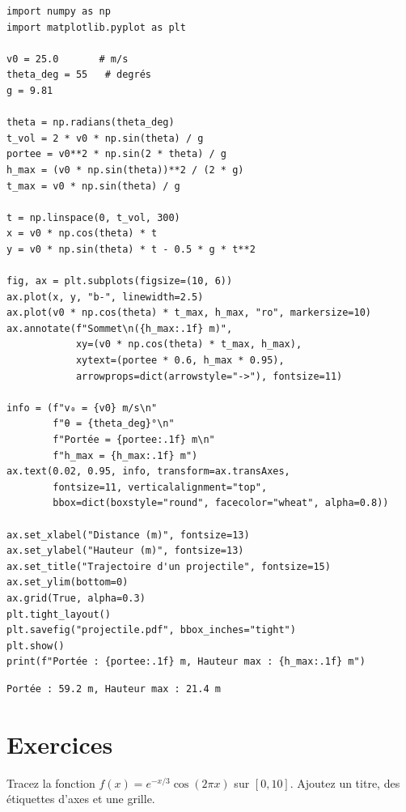 \begin{codeblock}[title=\textbf{Python}]
\begin{verbatim}
import numpy as np
import matplotlib.pyplot as plt

v0 = 25.0       # m/s
theta_deg = 55   # degrés
g = 9.81

theta = np.radians(theta_deg)
t_vol = 2 * v0 * np.sin(theta) / g
portee = v0**2 * np.sin(2 * theta) / g
h_max = (v0 * np.sin(theta))**2 / (2 * g)
t_max = v0 * np.sin(theta) / g

t = np.linspace(0, t_vol, 300)
x = v0 * np.cos(theta) * t
y = v0 * np.sin(theta) * t - 0.5 * g * t**2

fig, ax = plt.subplots(figsize=(10, 6))
ax.plot(x, y, "b-", linewidth=2.5)
ax.plot(v0 * np.cos(theta) * t_max, h_max, "ro", markersize=10)
ax.annotate(f"Sommet\n({h_max:.1f} m)",
            xy=(v0 * np.cos(theta) * t_max, h_max),
            xytext=(portee * 0.6, h_max * 0.95),
            arrowprops=dict(arrowstyle="->"), fontsize=11)

info = (f"v₀ = {v0} m/s\n"
        f"θ = {theta_deg}°\n"
        f"Portée = {portee:.1f} m\n"
        f"h_max = {h_max:.1f} m")
ax.text(0.02, 0.95, info, transform=ax.transAxes,
        fontsize=11, verticalalignment="top",
        bbox=dict(boxstyle="round", facecolor="wheat", alpha=0.8))

ax.set_xlabel("Distance (m)", fontsize=13)
ax.set_ylabel("Hauteur (m)", fontsize=13)
ax.set_title("Trajectoire d'un projectile", fontsize=15)
ax.set_ylim(bottom=0)
ax.grid(True, alpha=0.3)
plt.tight_layout()
plt.savefig("projectile.pdf", bbox_inches="tight")
plt.show()
print(f"Portée : {portee:.1f} m, Hauteur max : {h_max:.1f} m")
\end{verbatim}
\end{codeblock}

\begin{codeoutput}
\begin{verbatim}
Portée : 59.2 m, Hauteur max : 21.4 m
\end{verbatim}
\end{codeoutput}

\section{Exercices}

\begin{exercice}
Tracez la fonction $f(x) = e^{-x/3} \cos(2\pi x)$ sur $[0, 10]$.
Ajoutez un titre, des \'etiquettes d'axes et une grille.
\end{exercice}


